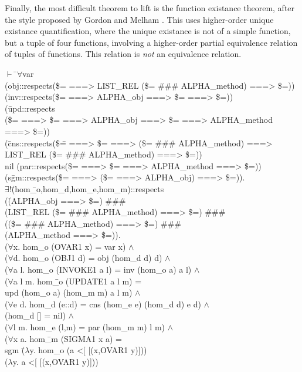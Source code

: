 \documentclass[envcountsame,runningheads]{llncs}
\newcommand{\quotient}{partial equivalence}
\begin{document}
Finally, the most difficult theorem to lift is the function existance
theorem, after the style proposed by Gordon and Melham \cite{GoMe96}. 
This uses higher-order unique existance quantification,
where the unique existance is not of a simple function,
but a tuple of four functions, involving a higher-order
\quotient{} relation of tuples of functions.  This relation is {\it not\/}
an equivalence relation.
{\tt \begin{tabbing}
$\vdash$ \=$\forall$var \\
\> (obj::respects(\$= ===> LIST\_REL (\$= \#\#\# ALPHA\_method) ===> \$=)) \\
\> (inv::respects(\$= ===> ALPHA\_obj ===> \$= ===> \$=)) \\
\> (\=upd::respects \\
\>\>(\$= ===> \$= ===> ALPHA\_obj ===> \$= ===> ALPHA\_method ===> \$=)) \\
\> (\=cns::respects(\$\= = ===> \$= ===> (\$= \#\#\# ALPHA\_method) ===> \\
\>\>\>             LIST\_REL (\$= \#\#\# ALPHA\_method) ===> \$=)) \\
\>\>nil (par::respects(\$= ===> \$= ===> ALPHA\_method ===> \$=)) \\
\> (s\=gm::respects(\$= ===> (\$= ===> ALPHA\_obj) ===> \$=)). \\
\>\> $\exists !$\=(hom\=\_o,hom\_d,hom\_e,hom\_m)::respects \\
\>\>\>\>   (\=(ALPHA\_obj ===> \$=) \#\#\# \\
\>\>\>\>\>  (LIST\_REL (\$= \#\#\# ALPHA\_method) ===> \$=) \#\#\# \\
\>\>\>\>\>  ((\$= \#\#\# ALPHA\_method) ===> \$=) \#\#\# \\
\>\>\>\>\>  (ALPHA\_method ===> \$=)). \\
\>\>\>($\forall$x. hom\_o (OVAR1 x) = var x) $\wedge$ \\
\>\>\>($\forall$d. hom\_o (OBJ1 d) = obj (hom\_d d) d) $\wedge$ \\
\>\>\>($\forall$a l. hom\_o (INVOKE1 a l) = inv (hom\_o a) a l) $\wedge$ \\
\>\>\>($\forall$a l m. hom\=\_o (UPDATE1 a l m) = \\
\>\>\>\>          upd (hom\_o a) (hom\_m m) a l m) $\wedge$ \\
\>\>\>($\forall$e d. hom\_d (e::d) = cns (hom\_e e) (hom\_d d) e d) $\wedge$ \\
\>\>\>(hom\_d [] = nil) $\wedge$ \\
\>\>\>($\forall$l m. hom\_e (l,m) = par (hom\_m m) l m) $\wedge$ \\
\>\>\>($\forall$x a. hom\=\_m (SIGMA1 x a) = \\
\>\>\>\>        sgm \=($\lambda$y. hom\_o (a <[ [(x,OVAR1 y)])) \\
\>\>\>\>\>          ($\lambda$y. a <[ [(x,OVAR1 y)]))
\end{tabbing}}
\end{document}
